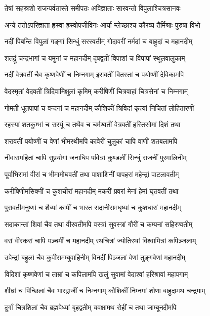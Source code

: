 \twolineshloka
{तेषां सहस्रशो राजन्पर्वतास्ते समीपतः}
{अविज्ञाताः सारवन्तो विपुलाश्चित्रसानवः}


\twolineshloka
{अन्ये ततोऽपरिज्ञाता ह्रस्वा ह्रस्वोपजीविनः}
{आर्या म्लेच्छाश्च कौरव्य तैर्मिश्राः पुरुषा विभो}


\twolineshloka
{नदीं पिबन्ति विपुलां गङ्गां सिन्धुं सरस्वतीम्}
{गोदावरीं नर्मदां च बाहुदां च महानदीम्}


\twolineshloka
{शतद्रूं चन्द्रभागां च यमुनां च महानदीम्}
{दृषद्वतीं विपाशां च विपापां स्थूलवालुकाम्}


\twolineshloka
{नदीं वेत्रवतीं चैव कृष्णवेणीं च निम्नगाम्}
{इरावतीं वितस्तां च पयोष्णीं देविकामपि}


\twolineshloka
{वेदस्मृतां वेदवतीं त्रिदिवामिक्षुलां कृमिम्}
{करीषिणीं चित्रवाहां चित्रसेनां च निम्नगाम्}


\twolineshloka
{गोमतीं धूतपापां च वन्दनां च महानदीम्}
{कौशिकीं त्रिविदां कृत्यां निचितां लोहितारणीं}


\twolineshloka
{रहस्यां शतकुम्भां च सरयूं च तथैव च}
{चर्मण्वतीं वेत्रवतीं हस्तिसोमां दिशं तथा}


\twolineshloka
{शरावतीं पयोष्णीं च वेणां भीमरथीमपि}
{कावेरीं चुलुकां चापि वाणीं शतबलामपि}


\twolineshloka
{नीवारामहितां चापि सुप्रयोगां जनाधिप}
{पवित्रां कुण्डलीं सिन्धुं राजनीं पुरमालिनीम्}


\twolineshloka
{पूर्वाभिरामां वीरां च भीमामोघवतीं तथा}
{पाशाशिनीं पापहरां महेन्द्रां पाटलावतीम्}


\twolineshloka
{करीषिणीमसिक्नीं च कुशचीरां महानदीम्}
{मकरीं प्रवरां मेनां हेमां घृतवतीं तथा}


\twolineshloka
{पुरावतीमनुष्णां च शैब्यां कापीं च भारत}
{सदानीरामधृष्यां च कुशधारां महानदीम्}


\twolineshloka
{सदाकान्तां शिवां चैव तथा वीरवतीमपि}
{वस्त्रां सुवस्त्रां गौरीं च कम्पनां सहिरण्वतीम्}


\twolineshloka
{वरां वीरकरां चापि पञ्चमीं च महानदीम्}
{रथचित्रां ज्योतिरथां विश्वामित्रां कपिञ्जलाम्}


\twolineshloka
{उपेन्द्रां बहुलां चैव कुवीरामम्बुवाहिनीम्}
{विनदीं पिञ्जलां वेणां तुङ्गवेणां महानदीम्}


\twolineshloka
{विदिशां कृष्णवेणां च ताम्रां च कपिलामपि}
{खलुं सुवामां वेदाश्वां हरिश्रावां महापगाम्}


\twolineshloka
{शीघ्रां च पिच्छिलां चैव भारद्वाजीं च निम्नगाम्}
{कौशिकीं निम्नगां शोणा बाहुदामथ चन्द्रमाम्}


\twolineshloka
{दुर्गां चित्रशिलां चैव ब्रह्मवेध्यां बृहद्वतीम्}
{यवक्षामथ रोहीं च तथा जाम्बूनदीमपि}


